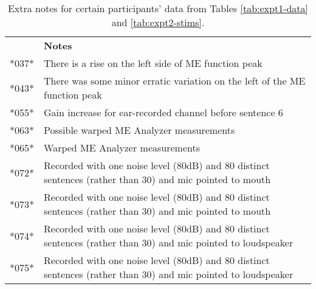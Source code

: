 \begin{table}
\begin{center}
\begin{tabular}{c|p{12cm}}
      & \textbf{Notes} \\
*037* & There is a rise on the left side of ME function peak \\
*043* & There was some minor erratic variation on the left of the ME function peak \\
*055* & Gain increase for ear-recorded channel before sentence 6 \\
*063* & Possible warped ME Analyzer measurements \\
*065* & Warped ME Analyzer measurements \\
*072* & Recorded with one noise level (80dB) and 80 distinct sentences (rather than 30) and mic pointed to mouth \\
*073* & Recorded with one noise level (80dB) and 80 distinct sentences (rather than 30) and mic pointed to mouth \\
*074* & Recorded with one noise level (80dB) and 80 distinct sentences (rather than 30) and mic pointed to loudspeaker \\
*075* & Recorded with one noise level (80dB) and 80 distinct sentences (rather than 30) and mic pointed to loudspeaker \\
\end{tabular}
\caption{Extra notes for certain participants' data from Tables \ref{tab:expt1-data} and \ref{tab:expt2-stims}.}
\end{center}
\end{table}

% 
% 
% 
% 
